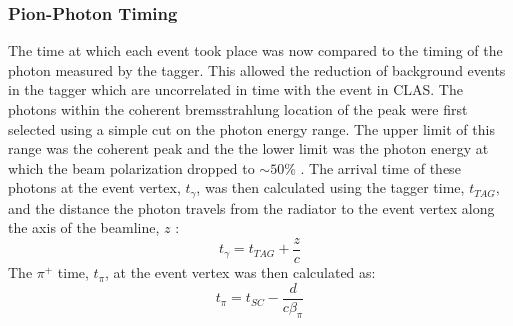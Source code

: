 \subsubsection{Pion-Photon Timing}
The time at which each event took place was now compared to the timing of the photon measured by the tagger. This allowed the reduction of background events in the tagger which are uncorrelated in time with the event in CLAS. The photons within the coherent bremsstrahlung location of the peak were first selected using a simple cut on the photon energy range. The upper limit of this range was the coherent peak and the the lower limit was the photon energy at which the beam polarization dropped to $\sim50\%$ . The arrival time of these photons at the event vertex, $ t_\gamma$, was then calculated using the tagger time, $t_{TAG}$, and the distance the photon travels from the radiator to the event vertex along the axis of the beamline, $z$ :
\begin{equation} \label{eqn:t_tag}
  t_\gamma = t_{TAG} + \frac{z}{c}
\end{equation}
The $\pi^+$ time, $t_\pi$, at the event vertex was then calculated as:
\begin{equation} \label{eqn:t_sc}
  t_\pi = t_{SC} - \frac{d}{c \beta_\pi}
\end{equation}
